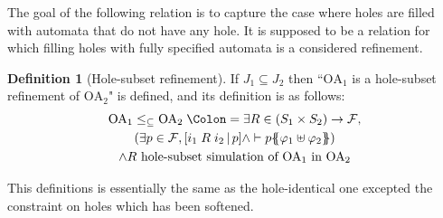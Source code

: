 \documentclass{article}
\theoremstyle{plain}
\theoremstyle{definition}
\newtheorem{defi}{Definition}
\newcommand\mpar[1]{{\left(#1\right)}}
\newcommand\mbrk[1]{{\left[#1\right]}}
\newcommand\mbrc[1]{{\left\{#1\right\}}}
\newcommand\psubst[1]{\mbrc{\!\!\mbrc{#1}\!\!}}
\newcommand\midbar{\,\middle|\,}
\newcommand\prel[4]{\mbrk{#2\mathrel{#1}#3\midbar #4}}
\newcommand\defnotation{\DOTSB\;{\Colon=}\;}
\newcommand\fformulae[1]{{\mathcal{F}}}
\begin{document}
The goal of the following relation is to capture the case where holes are filled with automata that do not have any hole.
It is supposed to be a relation for which filling holes with fully specified automata is a considered refinement.
\begin{defi}[Hole-subset refinement]
If \(J_1 \subseteq J_2\) then ``\(\mathrm{OA}_1\) is a hole-subset refinement of \(\mathrm{OA}_2\)" is defined, and its definition is as follows:
\begin{multline*}
	\mathrm{OA}_1 \leq_\subseteq \mathrm{OA}_2 \defnotation \exists R \in \mpar{S_1 \times S_2} \to \fformulae{E}, \\
	\mpar{\exists p \in \fformulae{E}, \prel{R}{i_1}{i_2}{p} \wedge \vdash p\psubst{\varphi_1 \uplus \varphi_2}} \\
	\wedge R \text{ hole-subset simulation of } \mathrm{OA}_1 \text{ in } \mathrm{OA}_2
\end{multline*}
\end{defi}
This definitions is essentially the same as the hole-identical one excepted the constraint on holes which has been softened.
\end{document}
